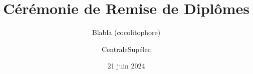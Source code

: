 \documentclass{beamer}
\title[Cérémonie de Remise de Diplômes - 21 juin 2024]{Cérémonie de Remise de Diplômes}
\subtitle{Blabla (cocolitophore)}
\author{CentraleSupélec}
\institute{14h - Amphithéâtre Michelin}
\date{21 juin 2024}
\begin{document}
\begin{frame}[plain]
  \titlepage
\end{frame}


\end{document}
